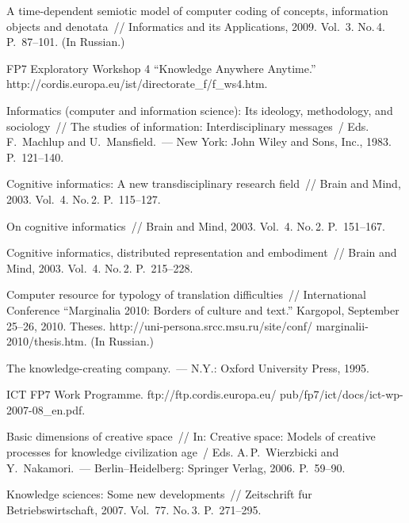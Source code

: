 \begin{multicols}{2}
{{\begin{thebibliography}{99}
     A time-dependent semiotic model of \mbox{computer} coding of concepts, information objects and 
denotata~// Informatics and its Applications, 2009. Vol.~3. No.\,4. P.~87--101. (In Russian.)
     
     FP7 Exploratory Workshop 4 ``Knowledge Anywhere Anytime.'' {\sf 
http://cordis.europa.eu/ist/directorate\_f/\linebreak f\_ws4.htm}.
     
     Informatics (computer and information science): Its ideology, methodology, and 
sociology~// The studies of information: Interdisciplinary messages~/ Eds. F.~Machlup and 
U.~Mansfield.~--- New York: John Wiley and Sons, Inc., 1983. P.~121--140.
     
     Cognitive informatics: A new transdisciplinary research field~// Brain and Mind, 2003. 
Vol.~4. No.\,2. P.~115--127.
     
     On cognitive informatics~// Brain and Mind, 2003. Vol.~4. No.\,2.  P.~151--167.
     
     Cognitive informatics, distributed representation and embodiment~// Brain and Mind, 
2003. Vol.~4. No.\,2.  P.~215--228.
     
     Computer resource for typology of translation difficulties~// International Conference 
``Marginalia 2010: Borders of culture and text.'' Kargopol, September 25--26, 2010. Theses.  {\sf 
http://uni-persona.srcc.msu.ru/site/conf/ marginalii-2010/thesis.htm}. (In Russian.)
     
     The knowledge-creating company.~--- N.Y.: Oxford University Press, 1995.
     
    ICT FP7 Work Programme.  
     {\sf ftp://ftp.cordis.europa.eu/ pub/fp7/ict/docs/ict-wp-2007-08\_en.pdf}.
     
     Basic dimensions of creative space~// In: Creative space: Models of creative processes for 
knowledge civilization age~/ Eds. A.\,P.~Wierzbicki and Y.~Nakamori.~--- Berlin--Heidelberg: 
Springer Verlag, 2006. P.~59--90.
     
     Knowledge sciences: Some new developments~// Zeitschrift f$\ddot{\mbox{u}}$r Betriebswirtschaft, 2007.  
Vol.~77.  No.\,3. P.~271--295.
     

\end{thebibliography}}}
\end{multicols}
